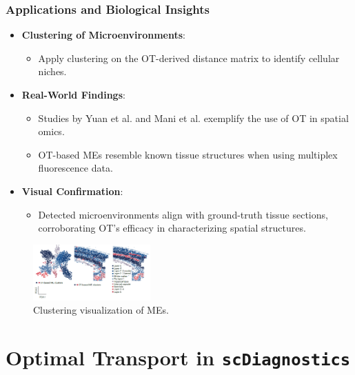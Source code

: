 \documentclass{beamer}
\begin{document}
			\begin{frame}
				\frametitle{Applications and Biological Insights}
				\begin{itemize}
					\item \textbf{Clustering of Microenvironments}:
						\begin{itemize}
							\item Apply clustering on the OT-derived distance matrix to identify cellular niches.
						\end{itemize}
						
						\item \textbf{Real-World Findings}:
							\begin{itemize}
								\item Studies by Yuan et al. and Mani et al. exemplify the use of OT in spatial omics.
								\item OT-based MEs resemble known tissue structures when using multiplex fluorescence data.
							\end{itemize}
							
							\item \textbf{Visual Confirmation}:
								\begin{itemize}
									\item Detected microenvironments align with ground-truth tissue sections, corroborating OT's efficacy in characterizing spatial structures.
								\end{itemize}
							\end{itemize}
							\begin{figure}
								\includegraphics[width=0.4\textwidth]{spatial2.png}
								\caption{Clustering visualization of MEs. \cite{bunne2024optimal}}
							\end{figure}
						\end{frame}
						
	
	\section{Optimal Transport in \texttt{scDiagnostics}}
	
\end{document}
